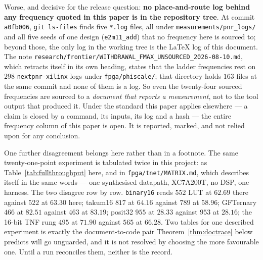 \documentclass[11pt]{article}
\theoremstyle{definition}
\begin{document}
Worse, and decisive for the release question: \textbf{no place-and-route log behind
any frequency quoted in this paper is in the repository tree}. At commit \texttt{a0fb006}, \texttt{git ls-files} finds five \texttt{*.log} files, all under \texttt{measurements/pnr\_logs/} and all five seeds of one design (\texttt{e2m11\_add}) that no frequency here is sourced to; beyond those, the only log in the working tree is the \LaTeX{} log of this document. The note \texttt{research/frontier/WITHDRAWAL\_FMAX\_UNSOURCED\_2026-08-10.md}, which retracts itself in its own heading, states that the ladder frequencies
rest on $298$ \texttt{nextpnr-xilinx} logs under \texttt{fpga/phiscale/}; that
directory holds $163$ files at the same commit and none of them is a log. So even the twenty-four
sourced frequencies are sourced to a \emph{document that reports a measurement},
not to the tool output that produced it. Under the standard this paper applies
elsewhere --- a claim is closed by a command, its inputs, its log and a hash --- the
entire frequency column of this paper is open. It is reported, marked, and not
relied upon for any conclusion.

One further disagreement belongs here rather than in a footnote. The same
twenty-one-point experiment is tabulated twice in this project: as
Table~\ref{tab:fullthroughput} here, and in \texttt{fpga/tnet/MATRIX.md}, which
describes itself in the same words --- one synthesised datapath, XC7A200T, no DSP,
one harness. The two disagree row by row. \texttt{binary16} reads $552$ LUT at
$62.69$ there against $522$ at $63.30$ here; takum16 $817$ at $64.16$ against $789$
at $58.96$; GFTernary $466$ at $82.51$ against $463$ at $83.19$; posit32 $955$ at
$28.33$ against $953$ at $28.16$; the 16-bit TNF rung $495$ at $71.90$ against $565$
at $66.28$. Two tables for one described experiment is exactly the document-to-code
pair Theorem~\ref{thm:doctrace} below predicts will go unguarded, and it is not
resolved by choosing the more favourable one. Until a run reconciles them, neither
is the record.
\end{document}
